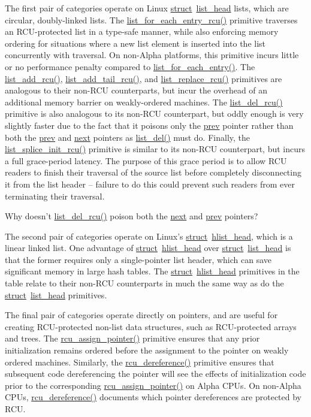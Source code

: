 The first pair of categories operate on Linux
\url{struct}~\url{list_head} lists, which are circular, doubly-linked
lists.
The \url{list_for_each_entry_rcu()} primitive traverses an
RCU-protected list in a type-safe manner, while also enforcing
memory ordering for situations where a new list element is inserted
into the list concurrently with traversal.
On non-Alpha platforms, this primitive incurs little or no performance
penalty compared to \url{list_for_each_entry()}.
The \url{list_add_rcu()}, \url{list_add_tail_rcu()},
and \url{list_replace_rcu()} primitives are analogous to
their non-RCU counterparts, but incur the overhead of an additional
memory barrier on weakly-ordered machines.
The \url{list_del_rcu()} primitive is also analogous to its
non-RCU counterpart, but oddly enough is very slightly faster due to the
fact that it poisons only the \url{prev} pointer rather than
both the \url{prev} and \url{next} pointers as
\url{list_del()} must do.
Finally, the \url{list_splice_init_rcu()} primitive is similar
to its non-RCU counterpart, but incurs a full grace-period latency.
The purpose of this grace period is to allow RCU readers to finish
their traversal of the source list before completely disconnecting
it from the list header -- failure to do this could prevent such
readers from ever terminating their traversal.

\QuickQuiz{}
	Why doesn't \url{list_del_rcu()} poison both the \url{next}
	and \url{prev} pointers?
 \QuickQuizEnd

The second pair of categories operate on Linux's
\url{struct}~\url{hlist_head}, which is a linear linked list.
One advantage of \url{struct}~\url{hlist_head} over
\url{struct}~\url{list_head} is that the former requires only
a single-pointer list header, which can save significant memory in
large hash tables.
The \url{struct}~\url{hlist_head} primitives in the table
relate to their non-RCU counterparts in much the same way as do the
\url{struct}~\url{list_head} primitives.

The final pair of categories operate directly on pointers, and
are useful for creating RCU-protected non-list data structures,
such as RCU-protected arrays and trees.
The \url{rcu_assign_pointer()} primitive ensures that any
prior initialization remains ordered before the assignment to the
pointer on weakly ordered machines.
Similarly, the \url{rcu_dereference()} primitive ensures that subsequent
code dereferencing the pointer will see the effects of initialization code
prior to the corresponding \url{rcu_assign_pointer()} on
Alpha CPUs.
On non-Alpha CPUs, \url{rcu_dereference()} documents which pointer
dereferences are protected by RCU.

